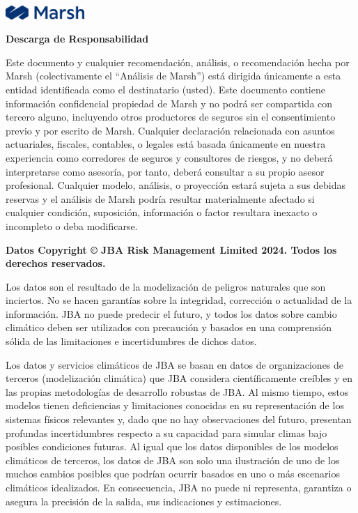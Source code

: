 \documentclass[
]{article}
\begin{document}
\noindent\includegraphics[width=3cm]{Logo.png}

\vspace{1cm}

\noindent\textbf{\textcolor{azuloscuro}{\fontsize{28}{32}\selectfont Descarga de Responsabilidad}}

\fontsize{11}{13}\selectfont Este documento y cualquier recomendación,
análisis, o recomendación hecha por Marsh (colectivamente el ``Análisis
de Marsh'') está dirigida únicamente a esta entidad identificada como el
destinatario (usted). Este documento contiene información confidencial
propiedad de Marsh y no podrá ser compartida con tercero alguno,
incluyendo otros productores de seguros sin el consentimiento previo y
por escrito de Marsh. Cualquier declaración relacionada con asuntos
actuariales, fiscales, contables, o legales está basada únicamente en
nuestra experiencia como corredores de seguros y consultores de riesgos,
y no deberá interpretarse como asesoría, por tanto, deberá consultar a
su propio asesor profesional. Cualquier modelo, análisis, o proyección
estará sujeta a sus debidas reservas y el análisis de Marsh podría
resultar materialmente afectado si cualquier condición, suposición,
información o factor resultara inexacto o incompleto o deba modificarse.

\textbf{Datos Copyright © JBA Risk Management Limited 2024. Todos los derechos reservados.}

\fontsize{11}{13}\selectfont Los datos son el resultado de la
modelización de peligros naturales que son inciertos. No se hacen
garantías sobre la integridad, corrección o actualidad de la
información. JBA no puede predecir el futuro, y todos los datos sobre
cambio climático deben ser utilizados con precaución y basados en una
comprensión sólida de las limitaciones e incertidumbres de dichos datos.

\fontsize{11}{13}\selectfont Los datos y servicios climáticos de JBA se
basan en datos de organizaciones de terceros (modelización climática)
que JBA considera científicamente creíbles y en las propias metodologías
de desarrollo robustas de JBA. Al mismo tiempo, estos modelos tienen
deficiencias y limitaciones conocidas en su representación de los
sistemas físicos relevantes y, dado que no hay observaciones del futuro,
presentan profundas incertidumbres respecto a su capacidad para simular
climas bajo posibles condiciones futuras. Al igual que los datos
disponibles de los modelos climáticos de terceros, los datos de JBA son
solo una ilustración de uno de los muchos cambios posibles que podrían
ocurrir basados en uno o más escenarios climáticos idealizados. En
consecuencia, JBA no puede ni representa, garantiza o asegura la
precisión de la salida, sus indicaciones y estimaciones.
\end{document}

